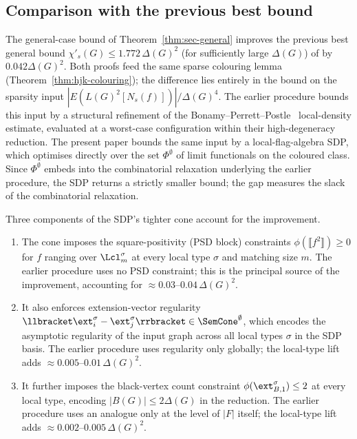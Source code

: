 \documentclass[11pt,a4paper]{article}
\theoremstyle{definition}
\theoremstyle{remark}
\begin{document}
\subsection{Comparison with the previous best bound}
\label{sec:hjk-compare}

The general-case bound of Theorem~\ref{thm:sec-general} improves the
previous best general bound $\chi'_s(G) \leq 1.772\,\Delta(G)^2$ (for sufficiently large $\Delta(G)$)
of \textcite{hurleyImprovedProcedureColouring2022} by $0.042 \Delta(G)^2$.
Both proofs feed the same sparse colouring lemma
(Theorem~\ref{thm:hjk-colouring}); the difference lies entirely in
the bound on the sparsity input
$|E(L(G)^2[N_s(f)])|/\Delta(G)^4$. The earlier procedure bounds this
input by a structural refinement of the
Bonamy--Perrett--Postle~\cite{bonamyColouringGraphsSparse2018}
local-density estimate, evaluated at a worst-case configuration
within their high-degeneracy reduction. The present paper bounds the
same input by a local-flag-algebra SDP, which optimises directly
over the set $\Phi^\emptyset$ of limit functionals on the coloured
class. Since $\Phi^\emptyset$ embeds into the combinatorial relaxation
underlying the earlier procedure, the SDP returns a strictly smaller
bound; the gap measures
the slack of the combinatorial relaxation.

Three components of the SDP's tighter cone account for the
improvement.

\begin{enumerate}
\item The cone imposes the square-positivity (PSD block) constraints
$\phi(\llbracket f^2 \rrbracket) \geq 0$ for $f$ ranging over
$\Lcl_m^\sigma$ at every local type $\sigma$ and matching size $m$.
The earlier procedure uses no PSD constraint; this is the principal source of the
improvement, accounting for $\approx 0.03$--$0.04\,\Delta(G)^2$.
\item It also enforces extension-vector regularity
$\llbracket \ext_i^\sigma - \ext_j^\sigma \rrbracket \in
\SemCone^\emptyset$, which encodes the asymptotic regularity of the
input graph across all local types $\sigma$ in the SDP basis. The
earlier procedure uses regularity only globally; the local-type lift adds
$\approx 0.005$--$0.01\,\Delta(G)^2$.
\item It further imposes the black-vertex count constraint
$\phi(\ext_{B,1}^\sigma) \leq 2$ at every local type, encoding
$|B(G)| \leq 2\Delta(G)$ in the reduction. The earlier procedure uses an analogue only
at the level of $|F|$ itself; the local-type lift adds
$\approx 0.002$--$0.005\,\Delta(G)^2$.
\end{enumerate}
\end{document}
